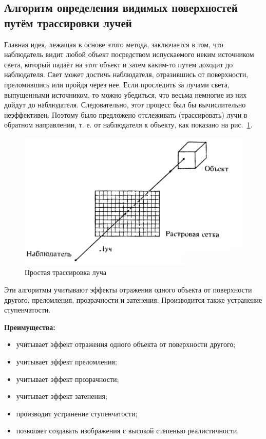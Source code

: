 \subsection{Алгоритм определения видимых поверхностей путём трассировки лучей}
Главная идея, лежащая в основе этого метода, заключается в том, что наблюдатель видит любой объект посредством испускаемого неким источником света, который падает на этот объект и затем каким-то путем доходит до наблюдателя. Свет может достичь наблюдателя, отразившись от поверхности, преломившись или пройдя через нее. Если проследить за лучами света, выпущенными источником, то можно убедиться, что весьма немногие из них дойдут до наблюдателя. Следовательно, этот процесс был бы вычислительно неэффективен. Поэтому было предложено отслеживать (трассировать) лучи в обратном направлении, т. е. от наблюдателя к объекту, как показано на рис.~\ref{fig:ray_tracing_pic}.
\begin{figure}[h]
	\centering
	\includegraphics[width=0.6\linewidth]{pictures/ray_tracing_pic.png}
	\caption{Простая трассировка луча}
	\label{fig:ray_tracing_pic}
\end{figure}

Эти алгоритмы учитывают эффекты отражения одного объекта от поверхности другого, преломления, прозрачности и затенения. Производится также устранение ступенчатости.

\textbf{Преимущества:}
\begin{itemize}
	\item учитывает эффект отражения одного объекта от поверхности другого;
	\item учитывает эффект преломления;
	\item учитывает эффект прозрачности;
	\item учитывает эффект затенения;
	\item производит устранение ступенчатости;
	\item позволяет создавать изображения с высокой степенью реалистичности.
\end{itemize}

